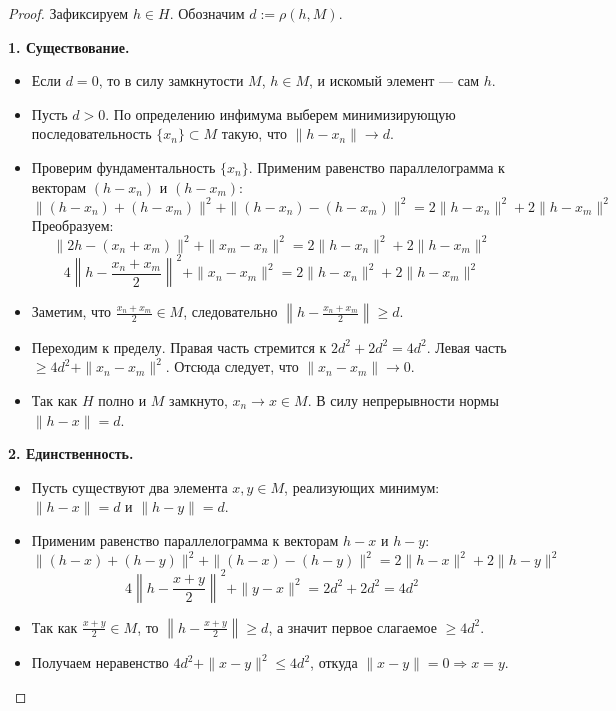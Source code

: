 \begin{proof}
	Зафиксируем $h \in H$. Обозначим $d := \rho(h, M)$.
	
	\textbf{1. Существование.}
	\begin{itemize}
		\item Если $d = 0$, то в силу замкнутости $M$, $h \in M$, и искомый элемент — сам $h$.
		\item Пусть $d > 0$. По определению инфимума выберем минимизирующую последовательность $\{x_n\} \subset M$ такую, что $\|h - x_n\| \to d$.
		\item Проверим фундаментальность $\{x_n\}$. Применим равенство параллелограмма к векторам $(h - x_n)$ и $(h - x_m)$:
		\[ \|(h - x_n) + (h - x_m)\|^2 + \|(h - x_n) - (h - x_m)\|^2 = 2\|h - x_n\|^2 + 2\|h - x_m\|^2 \]
		Преобразуем:
		\[ \|2h - (x_n + x_m)\|^2 + \|x_m - x_n\|^2 = 2\|h - x_n\|^2 + 2\|h - x_m\|^2 \]
		\[ 4\left\|h - \frac{x_n + x_m}{2}\right\|^2 + \|x_n - x_m\|^2 = 2\|h - x_n\|^2 + 2\|h - x_m\|^2 \]
		\item Заметим, что $\frac{x_n + x_m}{2} \in M$, следовательно $\left\|h - \frac{x_n + x_m}{2}\right\| \geqslant d$.
		\item Переходим к пределу. Правая часть стремится к $2d^2 + 2d^2 = 4d^2$. Левая часть $\geqslant 4d^2 + \|x_n - x_m\|^2$. Отсюда следует, что $\|x_n - x_m\| \to 0$.
		\item Так как $H$ полно и $M$ замкнуто, $x_n \to x \in M$. В силу непрерывности нормы $\|h - x\| = d$.
	\end{itemize}
	
	\textbf{2. Единственность.}
	\begin{itemize}
		\item Пусть существуют два элемента $x, y \in M$, реализующих минимум: $\|h - x\| = d$ и $\|h - y\| = d$.
		\item Применим равенство параллелограмма к векторам $h-x$ и $h-y$:
		\[ \|(h-x) + (h-y)\|^2 + \|(h-x) - (h-y)\|^2 = 2\|h-x\|^2 + 2\|h-y\|^2 \]
		\[ 4\left\|h - \frac{x+y}{2}\right\|^2 + \|y-x\|^2 = 2d^2 + 2d^2 = 4d^2 \]
		\item Так как $\frac{x+y}{2} \in M$, то $\left\|h - \frac{x+y}{2}\right\| \geqslant d$, а значит первое слагаемое $\geqslant 4d^2$.
		\item Получаем неравенство $4d^2 + \|x-y\|^2 \leqslant 4d^2$, откуда $\|x - y\| = 0 \Rightarrow x = y$.
	\end{itemize}
\end{proof}

